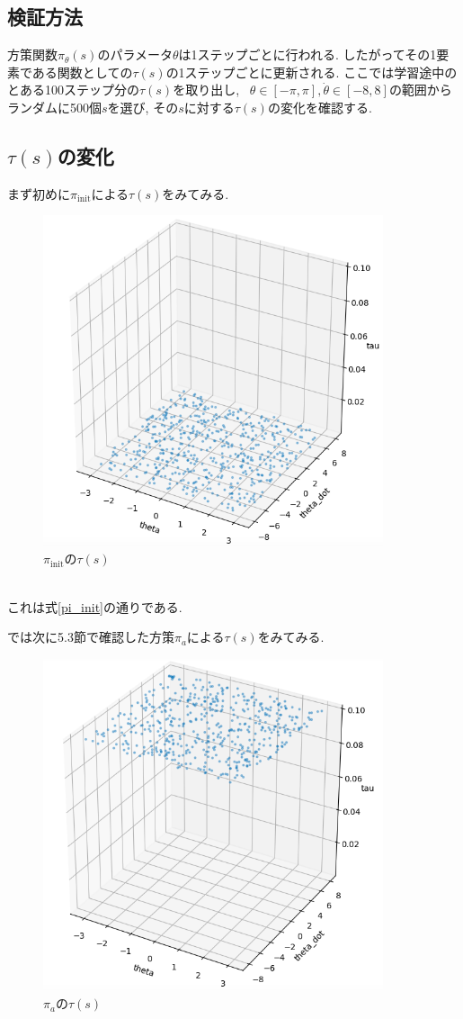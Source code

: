 \documentclass{jsarticle}
\begin{document}
\subsection{検証方法}
方策関数$\pi_{\theta}(s)$のパラメータ$\theta$は1ステップごとに行われる. したがってその1要素である関数としての$\tau(s)$の1ステップごとに更新される. ここでは学習途中のとある100ステップ分の$\tau(s)$を取り出し, ~$\theta\in [-\pi, \pi], \dot{\theta}\in [-8,8]$の範囲からランダムに500個$s$を選び, その$s$に対する$\tau(s)$の変化を確認する.

\subsection{$\tau(s)$の変化}
まず初めに$\pi_{\textrm{init}}$による$\tau(s)$をみてみる.
\begin{figure}[h]
	\centering
 	\includegraphics[width=10cm]{tau_dependency_of_initial_policy.png}
 	\caption{$\pi_{\textrm{init}}$の$\tau(s)$}
\end{figure}\\
これは式\eqref{pi_init}の通りである.\par
では次に5.3節で確認した方策$\pi_a$による$\tau(s)$をみてみる.
\begin{figure}[h]
	\centering
 	\includegraphics[width=10cm]{tau_dependency_of_last_policy.png}
 	\caption{$\pi_a$の$\tau(s)$} \label{last_policy_tau}
\end{figure}\\
\end{document}
